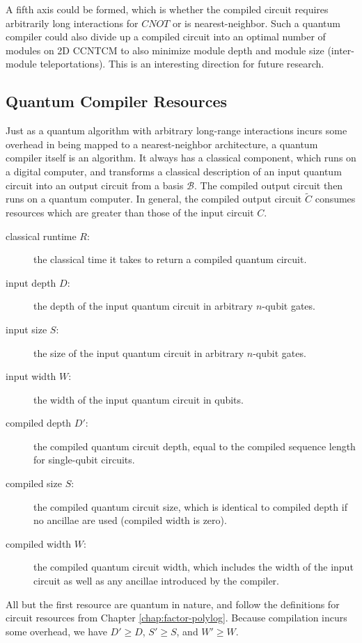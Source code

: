 A fifth axis could be formed, which is whether the compiled circuit requires
arbitrarily long interactions for $CNOT$ or is nearest-neighbor. Such a
quantum compiler could also divide up a compiled circuit into an optimal
number of modules on \textsf{2D CCNTCM} to also minimize module depth and
module size (inter-module teleportations). This is an interesting direction
for future research.

\subsection{Quantum Compiler Resources}

Just as a quantum algorithm with arbitrary long-range interactions incurs
some overhead in being mapped to a nearest-neighbor architecture,
a quantum compiler itself is an algorithm. It always has a classical
component, which runs on a digital computer, and transforms a classical
description of an input quantum circuit into an output circuit from
a basis $\mathcal{B}$. The compiled output circuit then runs on a
quantum computer. In general, the compiled output circuit $\tilde{C}$ consumes
resources which are greater than those of the input circuit $C$.

\begin{description}
\item[classical runtime $R$:] the classical time it takes to return a 
compiled quantum circuit.
\item[input depth $D$:] the depth of the input quantum circuit in arbitrary
$n$-qubit gates.
\item[input size $S$:] the size of the input quantum circuit in arbitrary
$n$-qubit gates.
\item[input width $W$:] the width of the input quantum circuit in qubits.
\item[compiled depth $D'$:] the compiled quantum circuit depth, equal to
the compiled sequence length for single-qubit circuits.
\item[compiled size $S$:] the compiled quantum circuit size, which is
identical to compiled depth if no ancillae are used (compiled width is zero).
\item[compiled width $W$:] the compiled quantum circuit width, which includes
the width of the input circuit as well as any ancillae introduced by
the compiler.
\end{description}

All but the first resource are quantum in nature, and follow the definitions
for circuit resources from Chapter \ref{chap:factor-polylog}. Because
compilation incurs some overhead, we have $D' \ge D$, $S' \ge S$, and
$W' \ge W$.

